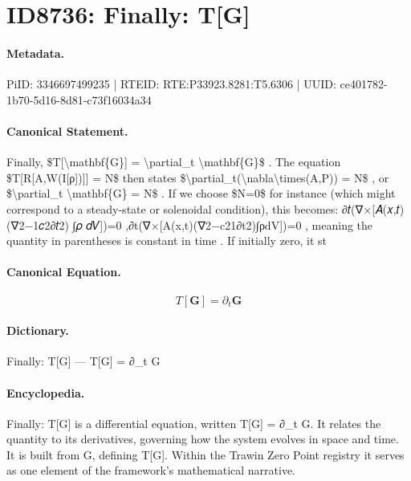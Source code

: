 \section*{ID8736: Finally: T[G]}
\paragraph{Metadata.}
PiID: 3346697499235 | RTEID: RTE:P33923.8281:T5.6306 | UUID: ce401782-1b70-5d16-8d81-c73f16034a34

\paragraph{Canonical Statement.}
Finally, \$T[\textbackslash{}mathbf\{G\}] = \textbackslash{}partial\_t \textbackslash{}mathbf\{G\}\$ . The equation \$T[R[A,W(I[ρ])]] = N\$ then states \$\textbackslash{}partial\_t(\textbackslash{}nabla\textbackslash{}times(A,P)) = N\$ , or \$\textbackslash{}partial\_t \textbackslash{}mathbf\{G\} = N\$ . If we choose \$N=0\$ for instance (which might correspond to a steady-state or solenoidal condition), this becomes: ∂𝑡(∇×[𝐴(𝑥,𝑡) (∇2−1𝑐2∂𝑡2) ⁣∫𝜌 𝑑𝑉])=0 ,∂t​(∇×[A(x,t)(∇2−c21​∂t2​)∫ρdV])=0 , meaning the quantity in parentheses is constant in time . If initially zero, it st

\paragraph{Canonical Equation.}
\[
T[\mathbf{G}] = \partial_t \mathbf{G}
\]

\paragraph{Dictionary.}
Finally: T[G] — T[G] = ∂\_t G

\paragraph{Encyclopedia.}
Finally: T[G] is a differential equation, written T[G] = ∂\_t G. It relates the quantity to its derivatives, governing how the system evolves in space and time. It is built from G, defining T[G]. Within the Trawin Zero Point registry it serves as one element of the framework's mathematical narrative.
